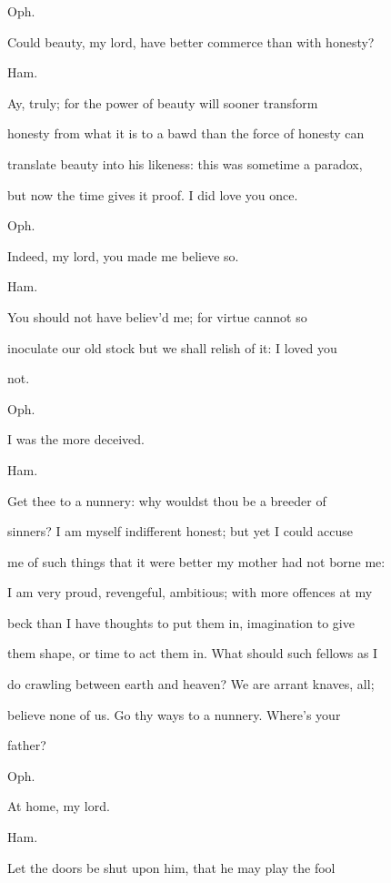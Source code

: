 \documentclass[12pt]{book}
\begin{document}
Oph.

Could beauty, my lord, have better commerce than with honesty?



Ham.

Ay, truly; for the power of beauty will sooner transform

honesty from what it is to a bawd than the force of honesty can

translate beauty into his likeness: this was sometime a paradox,

but now the time gives it proof. I did love you once.



Oph.

Indeed, my lord, you made me believe so.



Ham.

You should not have believ'd me; for virtue cannot so

inoculate our old stock but we shall relish of it: I loved you

not.



Oph.

I was the more deceived.



Ham.

Get thee to a nunnery: why wouldst thou be a breeder of

sinners? I am myself indifferent honest; but yet I could accuse

me of such things that it were better my mother had not borne me:

I am very proud, revengeful, ambitious; with more offences at my

beck than I have thoughts to put them in, imagination to give

them shape, or time to act them in. What should such fellows as I

do crawling between earth and heaven? We are arrant knaves, all;

believe none of us. Go thy ways to a nunnery. Where's your

father?



Oph.

At home, my lord.



Ham.

Let the doors be shut upon him, that he may play the fool
\end{document}

